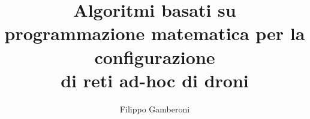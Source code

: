 \title{Algoritmi basati su programmazione matematica per la configurazione \\di reti ad-hoc di droni}



\newcommand{\myName}{Filippo Gamberoni}                         %
\newcommand{\myTitle}{Algoritmi\\ basati su programmazione matematica\\ per la configurazione di reti ad-hoc di droni}                    
\newcommand{\myDegree}{Tesi di Laurea Magistrale}                %
\newcommand{\myUni}{Università degli Studi di Padova}           %
\newcommand{\myFaculty}{Corso di Laurea Magistrale in Informatica}         %
\newcommand{\myDepartment}{Dipartimento di Matematica}          %
\newcommand{\myProf}{Luigi De Giovanni}                                %
\newcommand{\myLocation}{Padova}                                %
\newcommand{\myAA}{2015-2016}                                   %
\newcommand{\myTime}{Dic 2016}                                  %



\author{Filippo Gamberoni}






